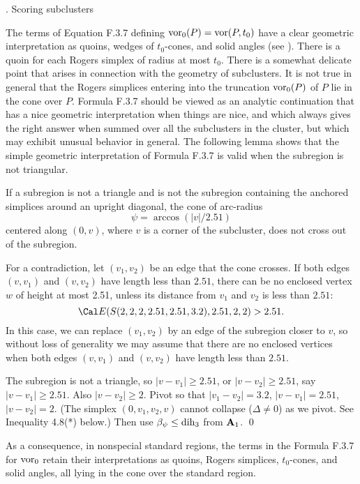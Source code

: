 \subhead {}.  Scoring subclusters\endsubhead

The terms of Equation F.3.7 defining $\operatorname{vor}_0(P)=\operatorname{vor}(P,t_0)$ have a clear
geometric interpretation as quoins, wedges of $t_0$-cones, and solid angles (see
\cite{F}). There is a quoin for each Rogers simplex of radius
at most $t_0$.  There is a somewhat delicate point that arises
in connection with the geometry of subclusters.  It is not true
in general
that the Rogers simplices entering into the truncation $\operatorname{vor}_0(P)$
of $P$ lie in the cone over $P$.  
  Formula F.3.7 should be
viewed as an analytic continuation that has a nice geometric interpretation
when things are nice, and which always gives the right answer
when summed over all the subclusters in the cluster, but which
may exhibit unusual behavior in general.  
The following lemma shows that the simple geometric interpretation
of Formula F.3.7 is valid when the subregion is not triangular.


If a subregion is not a triangle and is not  the subregion containing
the anchored simplices around an upright diagonal,
 the cone of arc-radius
$$\psi =\arccos(|v|/2.51)$$
centered along $(0,v)$, where $v$ is a corner of the subcluster,
does not cross out of the subregion.
\endproclaim

For a contradiction, let $(v_1,v_2)$ be an edge that the cone crosses.
If both edges $(v,v_1)$ and $(v,v_2)$ have length less than
$2.51$, there can be no enclosed vertex $w$ of height at most 2.51,
unless its distance from $v_1$ and $v_2$ is less than $2.51$:
	$$\Cal E(S(2,2,2,2.51,2.51,3.2),2.51,2,2)>2.51.$$
In this case, we can replace $(v_1,v_2)$ by an edge of the subregion
closer to $v$, so without loss of generality we may assume that there
are no enclosed vertices when both edges $(v,v_1)$ and $(v,v_2)$ have
length less than $2.51$.

The subregion is not a triangle, so
$|v-v_1|\ge 2.51$, or $|v-v_2|\ge 2.51$, say $|v-v_1|\ge 2.51$.
Also $|v-v_2|\ge2$.  Pivot so that $|v_1-v_2|=3.2$, $|v-v_1|=2.51$,
$|v-v_2|=2$.  (The simplex $(0,v_1,v_2,v)$ cannot collapse ($\Delta\ne0$)
as we pivot. See Inequality 4.8(*) below.)
Then use $\beta_\psi\le \operatorname{dih}_3$ from ${\bold A}_1$.
\qed
\enddemo

As a consequence, in nonspecial standard regions,
the terms in the Formula F.3.7 for $\operatorname{vor}_0$ 
retain their interpretations as quoins, Rogers simplices,
$t_0$-cones, and solid angles, all lying in the cone over the standard region.
\smallskip



